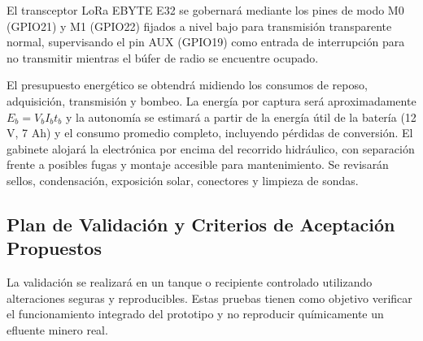 \documentclass[11pt,a4paper]{article}
\begin{document}
El transceptor LoRa EBYTE E32 se gobernará mediante los pines de modo M0 (GPIO21) y M1 (GPIO22) fijados a nivel bajo para transmisión transparente normal, supervisando el pin AUX (GPIO19) como entrada de interrupción para no transmitir mientras el búfer de radio se encuentre ocupado.

El presupuesto energético se obtendrá midiendo los consumos de reposo, adquisición, transmisión y bombeo. La energía por captura será aproximadamente $E_b=V_bI_bt_b$ y la autonomía se estimará a partir de la energía útil de la batería (12 V, 7 Ah) y el consumo promedio completo, incluyendo pérdidas de conversión. El gabinete alojará la electrónica por encima del recorrido hidráulico, con separación frente a posibles fugas y montaje accesible para mantenimiento. Se revisarán sellos, condensación, exposición solar, conectores y limpieza de sondas.

\subsection{Plan de Validación y Criterios de Aceptación Propuestos}

La validación se realizará en un tanque o recipiente controlado utilizando alteraciones seguras y reproducibles. Estas pruebas tienen como objetivo verificar el funcionamiento integrado del prototipo y no reproducir químicamente un efluente minero real.
\end{document}
